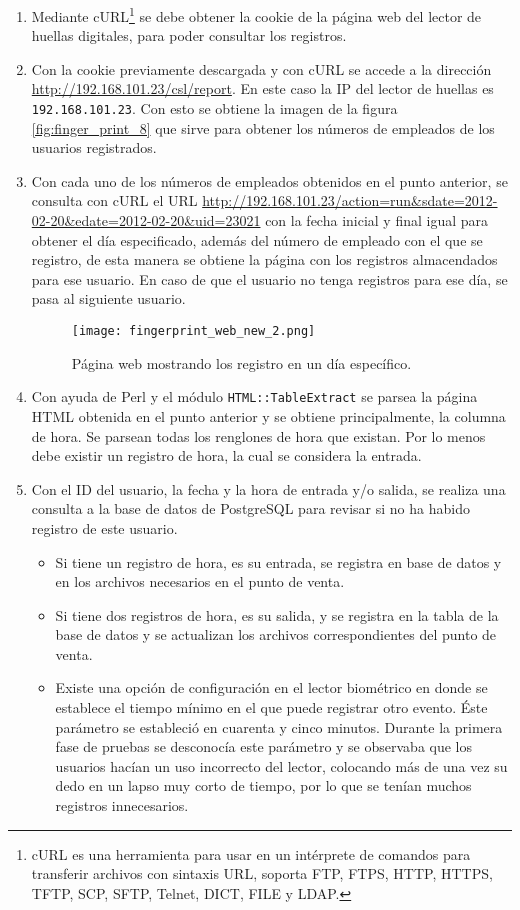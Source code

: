 \begin{enumerate}
 \item Mediante cURL\footnote{cURL es una herramienta para usar en un intérprete de comandos para transferir archivos con sintaxis URL, soporta FTP, FTPS, HTTP, HTTPS, TFTP, SCP, SFTP, Telnet, DICT, FILE y LDAP.} se debe obtener la cookie de la página web del lector de huellas digitales, para poder consultar los registros.
 \item Con la cookie previamente descargada y con cURL se accede a la dirección \url{http://192.168.101.23/csl/report}. En este caso la IP del lector de huellas es \texttt{192.168.101.23}. Con esto se obtiene la imagen de la figura \ref{fig:finger_print_8} que sirve para obtener los números de empleados de los usuarios registrados.
 \item Con cada uno de los números de empleados obtenidos en el punto anterior, se consulta con cURL el URL \url{http://192.168.101.23/action=run&sdate=2012-02-20&edate=2012-02-20&uid=23021} con la fecha inicial y final igual para obtener el día especificado, además del número de empleado con el que se registro, de esta manera se obtiene la página con los registros almacendados para ese usuario. En caso de que el usuario no tenga registros para ese día, se pasa al siguiente usuario.
 
 \begin{figure}[htb]
 \begin{center}
  \texttt{[image: fingerprint\_web\_new\_2.png]}
 \end{center}
 \caption{Página web mostrando los registro en un día específico.}
 \label{fig:finger_print_9}
\end{figure}
 
 \item Con ayuda de Perl y el módulo \texttt{HTML::TableExtract} se parsea la página HTML obtenida en el punto anterior y se obtiene principalmente, la columna de hora. Se parsean todas los renglones de hora que existan. Por lo menos debe existir un registro de hora, la cual se considera la entrada.
 \item Con el ID del usuario, la fecha y la hora de entrada y/o salida, se realiza una consulta a la base de datos de PostgreSQL para revisar si no ha habido registro de este usuario.
 \begin{itemize}
  \item Si tiene un registro de hora, es su entrada, se registra en base de datos y en los archivos necesarios en el punto de venta.
  \item Si tiene dos registros de hora, es su salida, y se registra en la tabla de la base de datos y se actualizan los archivos correspondientes del punto de venta.
  \item Existe una opción de configuración en el lector biométrico en donde se establece el tiempo mínimo en el que puede registrar otro evento. Éste parámetro se estableció en cuarenta y cinco minutos. Durante la primera fase de pruebas se desconocía este parámetro y se observaba que los usuarios hacían un uso incorrecto del lector, colocando más de una vez su dedo en un lapso muy corto de tiempo, por lo que se tenían muchos registros innecesarios.
 \end{itemize}


\end{enumerate}
